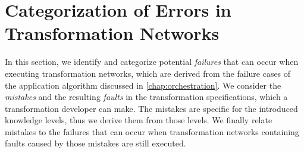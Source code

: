 \section{Categorization of Errors in Transformation Networks}


In this section, we identify and categorize potential \emph{failures} that can occur when executing transformation networks, which are derived from the failure cases of the application algorithm discussed in \autoref{chap:orchestration}.
We consider the \emph{mistakes} and the resulting \emph{faults} in the transformation specifications, which a transformation developer can make.
The mistakes are specific for the introduced knowledge levels, thus we derive them from those levels.
We finally relate mistakes to the failures that can occur when transformation networks containing faults caused by those mistakes are still executed.




